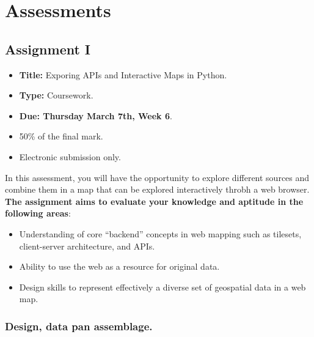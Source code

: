 \documentclass[
  letterpaper,
  DIV=11,
  numbers=noendperiod]{scrreprt}
\providecommand{\tightlist}{%
  \setlength{\itemsep}{0pt}\setlength{\parskip}{0pt}}\usepackage{longtable,booktabs,array}
\begin{document}

\hypertarget{assessments}{%
\chapter*{Assessments}\label{assessments}}


\hypertarget{assignment-i}{%
\section*{Assignment I}\label{assignment-i}}


\begin{itemize}
\tightlist
\item
  \textbf{Title:} Exporing APIs and Interactive Maps in Python.
\item
  \textbf{Type:} Coursework.
\item
  \textbf{Due: Thursday March 7th, Week 6}.
\item
  50\% of the final mark.
\item
  Electronic submission only.
\end{itemize}

In this assessment, you will have the opportunity to explore different
sources and combine them in a map that can be explored interactively
throbh a web browser. \textbf{The assignment aims to evaluate your
knowledge and aptitude in the following areas}:

\begin{itemize}
\tightlist
\item
  Understanding of core ``backend'' concepts in web mapping such as
  tilesets, client-server architecture, and APIs.
\item
  Ability to use the web as a resource for original data.
\item
  Design skills to represent effectively a diverse set of geospatial
  data in a web map.
\end{itemize}

\hypertarget{design-data-pan-assemblage.}{%
\subsection*{Design, data pan
assemblage.}\label{design-data-pan-assemblage.}}
\end{document}
